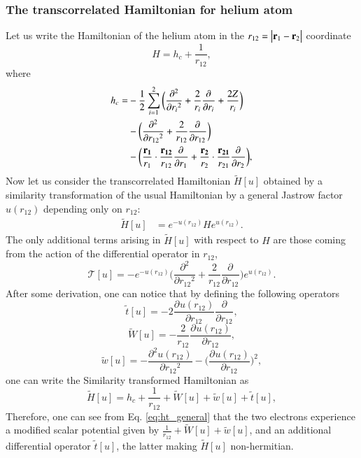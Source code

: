 \documentclass[aip,jcp,reprint,noshowkeys,superscriptaddress]{revtex4-1}
\newcommand{\deriv}[3]{\frac{\partial^{#3} #1}{\partial {#2}^{#3}}}
\newcommand{\bd}[1]{{\bf {#1}}}
\begin{document}
\subsubsection{The transcorrelated Hamiltonian for helium atom}
Let us write the Hamiltonian of the helium atom in the $ r_{12} = \big|{\bf r}_1 - {\bf r}_2 \big|$ coordinate 
\begin{equation}
 H  = h_c + \frac{1}{r_{12}},
\end{equation}
where 
\begin{equation}
 \begin{aligned}
 \label{def:h_c}
 h_c = &-\frac{1}{2} \sum_{i=1}^2 \bigg(\deriv{}{r_i}{2} + \frac{2}{r_i} \deriv{}{r_i}{} + \frac{2 Z}{r_i}\bigg) \\
     &-\bigg( \deriv{}{r_{12}}{2} + \frac{2}{r_{12}} \deriv{}{r_{12}}{} \bigg) \\
     &-\bigg( \frac{\bd{r_1}}{r_1} \cdot \frac{\bd{r_{12}} }{r_{12}}  \deriv{}{r_1}{} + 
                \frac{\bd{r_2}}{r_2} \cdot \frac{\bd{r_{21}} }{r_{21}}  \deriv{}{r_2}{} \bigg),
 \end{aligned}
\end{equation}
\label{sec:he_j}
Now let us consider the transcorrelated Hamiltonian $\tilde{H}[u]$ obtained by a similarity transformation of the usual Hamiltonian by a general Jastrow factor $u(r_{12})$ depending only on $r_{12}$: 
\begin{equation}
 \label{eq:ht_0}
 \begin{aligned}
 \tilde{H}[u]&= e^{-u(r_{12})} H e^{u(r_{12})}.
 \end{aligned}
\end{equation}
The only additional terms arising in $\tilde{H}[u]$ with respect to $H$ are those coming from the action of the differential operator in $r_{12}$,
\begin{equation}
 \mathcal{T}[u] =  -e^{-u(r_{12})}\bigg( \deriv{}{r_{12}}{2} + \frac{2}{r_{12}} \deriv{}{r_{12}}{} \bigg)e^{u(r_{12})}.  
\end{equation}
After some derivation, one can notice that by defining the following operators 
\begin{equation}
 \label{eq:def_tt}
 \tilde{t}[u] = -2 \deriv{u(r_{12})}{r_{12}}{} \deriv{}{r_{12}}{},
\end{equation}
\begin{equation}
 \label{eq:def_wt}
 \tilde{W}[u] = -\frac{2}{r_{12}} \deriv{u(r_{12})}{r_{12}}{}  , 
\end{equation}
\begin{equation}
 \label{eq:def_wt}
 \tilde{w}[u] = -\deriv{u(r_{12})}{r_{12}}{2} - \bigg( \deriv{u(r_{12})}{r_{12}}{} \bigg)^2, 
\end{equation}
one can write the Similarity transformed Hamiltonian  as
\begin{equation}
 \label{eq:ht_general}
 \tilde{H}[u] = h_c + \frac{1}{r_{12}}  + \tilde{W}[u] + \tilde{w}[u] + \tilde{t}[u] ,
\end{equation}
Therefore, one can see from Eq. \eqref{eq:ht_general} that the two electrons experience a modified scalar potential given by $\frac{1}{r_{12}}  + \tilde{W}[u] + \tilde{w}[u]$, and an additional differential operator $\tilde{t}[u]$, 
the latter making $\tilde{H}[u]$ non-hermitian.   
\end{document}
